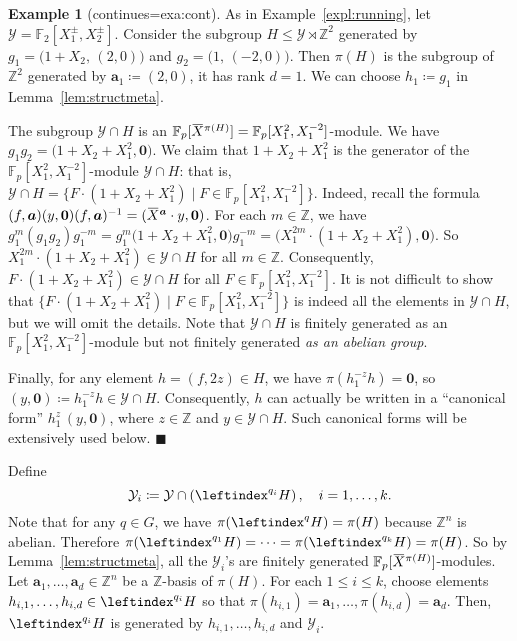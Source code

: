 \documentclass[a4paper,UKenglish,cleveref, autoref, thm-restate]{lipics-v2021}
\newcommand{\Z}{\mathbb{Z}}
\newcommand{\F}{\mathbb{F}}
\newcommand{\mY}{\mathcal{Y}}
\newcommand{\ba}{\boldsymbol{a}}
\newcommand{\bzer}{\boldsymbol{0}}
\newcommand{\oX}{\mkern 1.5mu\overline{\mkern-1.5mu X \mkern-1.5mu}\mkern 1.5mu}
\theoremstyle{definition}
\theoremstyle{definition}
\newtheorem{exmpl}[thrm]{Example}
\theoremstyle{definition}
\begin{document}
\renewcommand\thmcontinues[1]{continued}
\begin{exmpl}[continues=exa:cont]
As in Example~\ref{expl:running}, let $\mY = \F_2[X_1^{\pm}, X_2^{\pm}]$.
Consider the subgroup $H \leq \mY \rtimes \Z^2$ generated by $g_1 = \big(1 + X_2, \, (2, 0)\big)$ and $g_2 = \big(1, \, (- 2, 0)\big)$.
Then $\pi(H)$ is the subgroup of $\Z^2$ generated by $\ba_1 \coloneqq (2, 0)$, it has rank $d = 1$. 
We can choose $h_1 \coloneqq g_1$ in Lemma~\ref{lem:structmeta}.

The subgroup $\mY \cap H$ is an $\F_p[\oX^{\pi(H)}] = \F_p[X_1^2, X_1^{-2}]$-module. We have $g_1 g_2 = \big(1 + X_2 + X_1^2, \bzer \big)$.
We claim that $1 + X_2 + X_1^2$ is the generator of the $\F_p[X_1^2, X_1^{-2}]$-module $\mY \cap H$:
that is, $\mY \cap H = \{F \cdot (1 + X_2 + X_1^2) \mid F \in \F_p[X_1^2, X_1^{-2}]\}$. 
Indeed, recall the formula $(f, \ba)(y, \bzer)(f, \ba)^{-1} = (\oX^{\ba} \cdot y, \bzer)$.
For each $m \in \Z$, we have $g_1^m (g_1 g_2) g_1^{-m} = g_1^m \big(1 + X_2 + X_1^2, \bzer\big) g_1^{-m} = \big(X_1^{2m} \cdot (1 + X_2 + X_1^2), \bzer\big)$.
So $X_1^{2m} \cdot (1 + X_2 + X_1^2) \in \mY \cap H$ for all $m \in \Z$.
Consequently, $F \cdot (1 + X_2 + X_1^2) \in \mY \cap H$ for all $F \in \F_p[X_1^2, X_1^{-2}]$.
It is not difficult to show that $\{F \cdot (1 + X_2 + X_1^2) \mid F \in \F_p[X_1^2, X_1^{-2}]\}$ is indeed all the elements in $\mY \cap H$, but we will omit the details.
Note that $\mY \cap H$ is finitely generated as an $\F_p[X_1^2, X_1^{-2}]$-module but not finitely generated \emph{as an abelian group}.

Finally, for any element $h = (f, 2z) \in H$, we have $\pi(h_1^{-z} h) = \bzer$, so $(y, \bzer) \coloneqq h_1^{-z} h \in \mY \cap H$. 
Consequently, $h$ can actually be written in a ``canonical form'' $h_1^z \, (y, \bzer)$, where $z \in \Z$ and $y \in \mY \cap H$.
Such canonical forms will be extensively used below.
\hfill $\blacksquare$
\end{exmpl}

Define
\[
\mY_i \coloneqq \mY \cap \left(\leftindex^{q_i}{H}\right), \quad i = 1, \ldots, k.
\]
Note that for any $q \in G$, we have $\pi(\leftindex^{q}{H}) = \pi(H)$ because $\Z^n$ is abelian. Therefore $\pi(\leftindex^{q_1}{H}) = \cdots = \pi(\leftindex^{q_k}{H}) = \pi(H)$.
So by Lemma~\ref{lem:structmeta}, all the $\mY_i$'s are finitely generated $\F_p[\oX^{\pi(H)}]$-modules.
Let $\ba_1, \ldots, \ba_{d} \in \Z^n$ be a $\Z$-basis of $\pi(H)$.
For each $1 \leq i \leq k$, choose elements $h_{i,1}, \ldots, h_{i,d} \in \leftindex^{q_i}{H}$ so that $\pi(h_{i,1}) = \ba_1, \ldots, \pi(h_{i,d}) = \ba_d$.
Then, $\leftindex^{q_i}{H}$ is generated by $h_{i,1}, \ldots, h_{i,d}$ and $\mY_i$.
\end{document}
